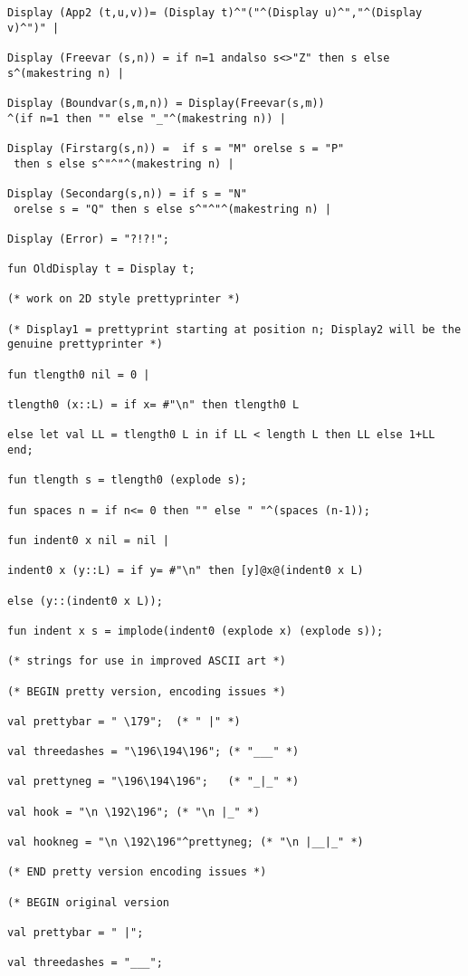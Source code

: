 \documentclass{article}
\begin{document}
{{\begin{verbatim}
Display (App2 (t,u,v))= (Display t)^"("^(Display u)^","^(Display v)^")" |

Display (Freevar (s,n)) = if n=1 andalso s<>"Z" then s else  s^(makestring n) |

Display (Boundvar(s,m,n)) = Display(Freevar(s,m))
^(if n=1 then "" else "_"^(makestring n)) |

Display (Firstarg(s,n)) =  if s = "M" orelse s = "P"
 then s else s^"^"^(makestring n) |

Display (Secondarg(s,n)) = if s = "N"
 orelse s = "Q" then s else s^"^"^(makestring n) |

Display (Error) = "?!?!";

fun OldDisplay t = Display t;

(* work on 2D style prettyprinter *)

(* Display1 = prettyprint starting at position n; Display2 will be the
genuine prettyprinter *)

fun tlength0 nil = 0 |

tlength0 (x::L) = if x= #"\n" then tlength0 L

else let val LL = tlength0 L in if LL < length L then LL else 1+LL end;

fun tlength s = tlength0 (explode s);

fun spaces n = if n<= 0 then "" else " "^(spaces (n-1));

fun indent0 x nil = nil |

indent0 x (y::L) = if y= #"\n" then [y]@x@(indent0 x L)

else (y::(indent0 x L));

fun indent x s = implode(indent0 (explode x) (explode s));

(* strings for use in improved ASCII art *)

(* BEGIN pretty version, encoding issues *)

val prettybar = " \179";  (* " |" *)

val threedashes = "\196\194\196"; (* "___" *)

val prettyneg = "\196\194\196";   (* "_|_" *)

val hook = "\n \192\196"; (* "\n |_" *)

val hookneg = "\n \192\196"^prettyneg; (* "\n |__|_" *)

(* END pretty version encoding issues *)

(* BEGIN original version 

val prettybar = " |";

val threedashes = "___";


\end{verbatim}}}
\end{document}
